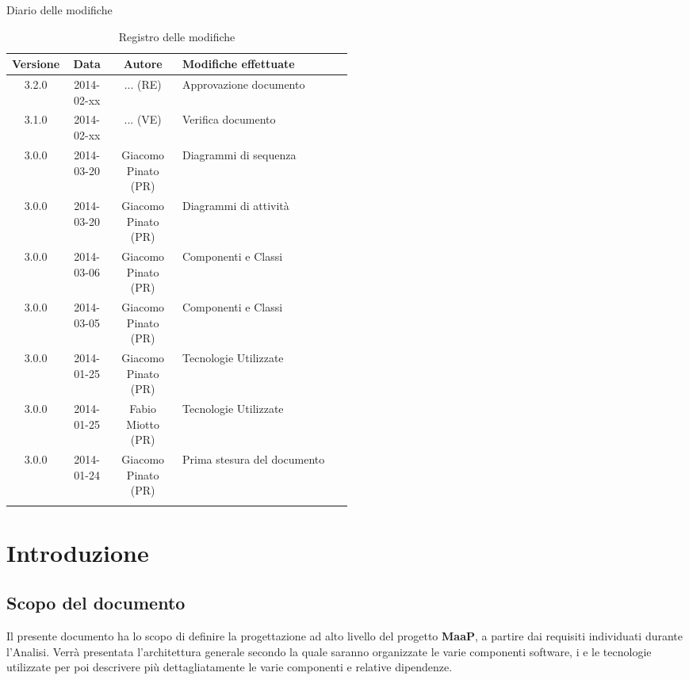 
\newpage
Diario delle modifiche
\begin{center}
\begin{longtable}{|c|c|c|p{0.5\linewidth}|}
\toprule
\textbf{Versione} & \textbf{Data} & \textbf{Autore} & \textbf{Modifiche effettuate}\\

\midrule
3.2.0 & 2014-02-xx & ... (RE) & Approvazione documento\\
\midrule
3.1.0 & 2014-02-xx & ... (VE) & Verifica documento\\
\midrule
3.0.0 & 2014-03-20 & Giacomo Pinato (PR) & Diagrammi di sequenza\\
\midrule
3.0.0 & 2014-03-20 & Giacomo Pinato (PR) & Diagrammi di attività\\
\midrule
3.0.0 & 2014-03-06 & Giacomo Pinato (PR) & Componenti e Classi\\
\midrule
3.0.0 & 2014-03-05 & Giacomo Pinato (PR) & Componenti e Classi\\
\midrule
3.0.0 & 2014-01-25 & Giacomo Pinato (PR) & Tecnologie Utilizzate\\
\midrule
3.0.0 & 2014-01-25 & Fabio Miotto (PR) & Tecnologie Utilizzate\\
\midrule
3.0.0 & 2014-01-24 & Giacomo Pinato (PR) & Prima stesura del documento\\

\bottomrule
\caption{Registro delle modifiche}
\label{tab:changelog}

\end{longtable}
\end{center}

\newpage
\tableofcontents

\newpage
\listoffigures %

\newpage
\section{Introduzione}
\subsection{Scopo del documento}
Il presente documento ha lo scopo di definire la progettazione ad alto livello del progetto \textbf{MaaP}, a partire dai requisiti individuati durante l'Analisi. Verrà presentata l'architettura generale secondo la quale saranno organizzate le varie componenti software, i  e le tecnologie utilizzate per poi descrivere più dettagliatamente le varie componenti e relative dipendenze.

